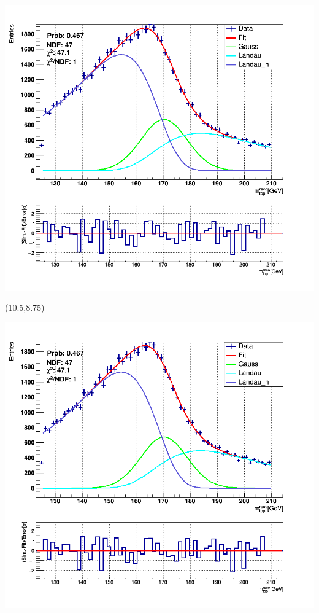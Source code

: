 \documentclass[green,compress,10pt]{beamer}
\begin{document}
{\begin{textblock}{7.5}
		\includegraphics[width=0.725\linewidth]{PicsTop/170mtop.png}
		
		
	\end{textblock}	
	
	\begin{textblock}{7.5}(10.5,8.75)
		
		\includegraphics[width=0.725\linewidth]{PicsTop/170mtop.png}
		
		
	\end{textblock}	
	
	
	
	
}
\end{document}
